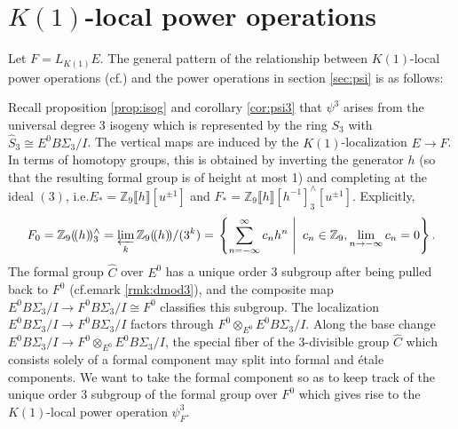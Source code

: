 \documentclass{gtpart}
\theoremstyle{definition}
\theoremstyle{remark}
\newcommand{\mb}[1]{\mathbb{#1}}
\newcommand{\cf}[1]{cf.\thinspace{\cite{#1}}}
\newcommand{\BZ}{{\mb Z}}
\newcommand{\HC}{\widehat{C}}
\newcommand{\HS}{\widehat{S}}
\newcommand{\p}{\psi^3}
\begin{document}
\section{$K(1)$-local power operations}
\label{sec:K(1)}

Let $F = L_{K(1)} E$.  The general pattern of the relationship between $K(1)$-local power operations (\cf{K(1)E_infty}) 
and the power operations in section \ref{sec:psi} is as follows: 
\begin{center}
\end{center}
Recall proposition \ref{prop:isog} and corollary \ref{cor:psi3} that $\p$ arises from the universal degree 3 isogeny 
which is represented by the ring $S_3$ with $\HS_3 \cong E^0 B\Sigma_3 / I$.  The 
vertical maps are induced by the $K(1)$-localization $E \to F$.  In terms of 
homotopy groups, this is obtained by inverting the generator $h$ (so that 
the resulting formal group is of height at most 1) and completing at the ideal 
$(3)$, i.e.\thinspace$E_* = \BZ_9 \llbracket h \rrbracket [u^{\pm1}]$ and $F_* = \BZ_9 \llbracket h \rrbracket [h^{-1}]_3^\wedge [u^{\pm1}]$.  
Explicitly, 
\[
 F_0 = \BZ_9 (\!(h)\!)_3^\wedge = \varprojlim_k \BZ_9 (\!(h)\!) /(3^k) = 
 \left.\left\{\sum_{n = -\infty}^{\infty} c_n h^n~\right|~c_n \in \BZ_9, 
 \lim_{n \to -\infty} c_n = 0\right\}.  
\]
The formal group $\HC$ over $E^0$ has a unique order 3 subgroup after being pulled back to $F^0$ (cf.emark \ref{rmk:dmod3}), 
and the composite map $E^0 B\Sigma_3 / I \to F^0 B\Sigma_3 / I \cong F^0$ classifies this subgroup.  
The localization $E^0 B\Sigma_3 / I \to F^0 B\Sigma_3 / I$ factors through $F^0 \otimes_{E^0} E^0 B\Sigma_3 / I$.  
Along the base change $E^0 B\Sigma_3 / I \to F^0 \otimes_{E^0} E^0 B\Sigma_3 / I$, 
the special fiber of the 3-divisible group $\HC$ which consists solely of a formal component may split into formal and \'etale components.  
We want to take the formal component so as to keep track of the unique order 3 subgroup of the formal group over $F^0$ 
which gives rise to the $K(1)$-local power operation $\psi_F^3$.  
\end{document}
